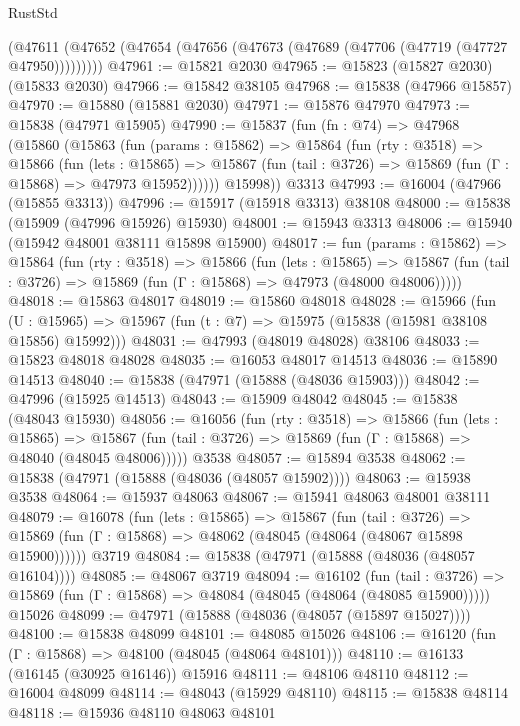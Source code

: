 \begin{lexlean}{RustStd}
\begin{coremodule}
    (@47611 (@47652 (@47654 (@47656 (@47673 (@47689 (@47706 (@47719 (@47727 @47950)))))))))
@47961 := @15821 @2030
@47965 := @15823 (@15827 @2030) (@15833 @2030)
@47966 := @15842 @38105
@47968 := @15838 (@47966 @15857)
@47970 := @15880 (@15881 @2030)
@47971 := @15876 @47970
@47973 := @15838 (@47971 @15905)
@47990 := @15837
    (fun (fn : @74) =>
    @47968
      (@15860
        (@15863
          (fun (params : @15862) =>
          @15864
            (fun (rty : @3518) =>
            @15866
              (fun (lets : @15865) =>
              @15867 (fun (tail : @3726) => @15869 (fun (Γ : @15868) => @47973 @15952))))))
        @15998))
    @3313
@47993 := @16004 (@47966 (@15855 @3313))
@47996 := @15917 (@15918 @3313) @38108
@48000 := @15838 (@15909 (@47996 @15926) @15930)
@48001 := @15943 @3313
@48006 := @15940 (@15942 @48001 @38111 @15898 @15900)
@48017 := fun (params : @15862) =>
  @15864
    (fun (rty : @3518) =>
    @15866
      (fun (lets : @15865) =>
      @15867 (fun (tail : @3726) => @15869 (fun (Γ : @15868) => @47973 (@48000 @48006)))))
@48018 := @15863 @48017
@48019 := @15860 @48018
@48028 := @15966
    (fun (U : @15965) => @15967 (fun (t : @7) => @15975 (@15838 (@15981 @38108 @15856) @15992)))
@48031 := @47993 (@48019 @48028) @38106
@48033 := @15823 @48018 @48028
@48035 := @16053 @48017 @14513
@48036 := @15890 @14513
@48040 := @15838 (@47971 (@15888 (@48036 @15903)))
@48042 := @47996 (@15925 @14513)
@48043 := @15909 @48042
@48045 := @15838 (@48043 @15930)
@48056 := @16056
    (fun (rty : @3518) =>
    @15866
      (fun (lets : @15865) =>
      @15867 (fun (tail : @3726) => @15869 (fun (Γ : @15868) => @48040 (@48045 @48006)))))
    @3538
@48057 := @15894 @3538
@48062 := @15838 (@47971 (@15888 (@48036 (@48057 @15902))))
@48063 := @15938 @3538
@48064 := @15937 @48063
@48067 := @15941 @48063 @48001 @38111
@48079 := @16078
    (fun (lets : @15865) =>
    @15867
      (fun (tail : @3726) =>
      @15869 (fun (Γ : @15868) => @48062 (@48045 (@48064 (@48067 @15898 @15900))))))
    @3719
@48084 := @15838 (@47971 (@15888 (@48036 (@48057 @16104))))
@48085 := @48067 @3719
@48094 := @16102
    (fun (tail : @3726) => @15869 (fun (Γ : @15868) => @48084 (@48045 (@48064 (@48085 @15900)))))
    @15026
@48099 := @47971 (@15888 (@48036 (@48057 (@15897 @15027))))
@48100 := @15838 @48099
@48101 := @48085 @15026
@48106 := @16120 (fun (Γ : @15868) => @48100 (@48045 (@48064 @48101)))
@48110 := @16133 (@16145 (@30925 @16146)) @15916
@48111 := @48106 @48110
@48112 := @16004 @48099
@48114 := @48043 (@15929 @48110)
@48115 := @15838 @48114
@48118 := @15936 @48110 @48063 @48101

\end{coremodule}
\end{lexlean}
